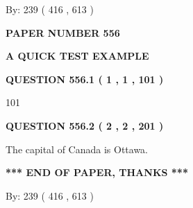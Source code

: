 \documentclass[12pt]{article}
\begin{document}
   
\hspace{1.0in} By: 
 239 ( 416 ,  613 )
   
   
   
   
\newpage 
\setcounter{page}{ 
   556001 } 
   
   
   
   
 {\textbf{ \Large{ PAPER NUMBER  556  }}}
   
   
\vspace{0.2in}
   
   
   
   
   
   
 \vspace{0.2in}
{\LARGE {\textbf{ A QUICK TEST EXAMPLE}}}
   
   
  
\vspace{0.2in}
  
{\textbf{\Large{QUESTION
556.1 
 ( 1 , 1 , 101 )
}}}
  
  
 
 
\noindent{}

101
 
 
  
\vspace{0.2in}
  
{\textbf{\Large{QUESTION
556.2 
 ( 2 , 2 , 201 )
}}}
  
  
 
 
\noindent{}
 
 
The capital of Canada is Ottawa.
 
 
 
 
   
   
 \vspace{0.2in}
 
   
   
   
   
\vspace{1.0in} 
{\textbf{\large{ *** END OF PAPER, THANKS *** }}} 
   
   
\hspace{1.0in} By: 
 239 ( 416 ,  613 )
   
   
   
   
\newpage 
\setcounter{page}{ 
   557001 } 
   
   
   
\end{document}

